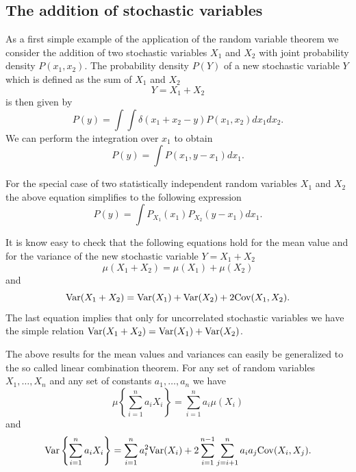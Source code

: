 \subsection{The addition of stochastic variables}
As a first simple example of the application of the random 
variable theorem we consider the addition of two stochastic 
variables $X_1$ and $X_2$ with joint probability density
$P(x_1,x_2)$. The probability density $P(Y) $ of a new stochastic variable
$Y$ which is defined as the sum of $X_1$ and $X_2$ 
\begin{equation}
Y = X_1 + X_2
\end{equation}
is then given by
\begin{equation}
P(y) = \int \int \delta(x_1 +x_2 -y) P(x_1,x_2) dx_1 dx_2.
\end{equation}
We can perform the integration over $x_1$ to obtain
\begin{equation}
P(y) = \int P(x_1,y-x_1) dx_1.
\end{equation}

For the special case of two statistically independent random 
variables $X_1$ and $X_2$ the above equation simplifies to the 
following expression
\begin{equation}
P(y) = \int P_{X_1}(x_1)P_{X_2}(y-x_1) dx_1.
\end{equation}

It is know easy to check that the following equations hold
for the mean value and for the variance of the new stochastic 
variable $Y=X_1 + X_2$
\begin{equation}
\mu(X_1 +X_2) = \mu(X_1) + \mu(X_2)
\end{equation}
and
\begin{equation*}
{\rm Var}(X_1 + X_2) = {\rm Var}(X_1) + {\rm Var}(X_2) +
            2 {\rm Cov}(X_1,X_2).
\end{equation*}
The last equation implies that only for uncorrelated stochastic 
variables we have the simple relation 
${\rm Var}(X_1 + X_2) = {\rm Var}(X_1) + {\rm Var}(X_2)$.

The above results for the mean values and variances can easily be 
generalized to the so called linear combination theorem. For any
set of random variables $X_1, \ldots, X_n$ and any set of 
constants $a_1,\ldots, a_n$ we have
\begin{equation*}
\mu\left\{  \sum_{i=1}^n a_i X_i \right\} =
     \sum_{i=1}^n a_i \mu(X_i) 
\end{equation*}
and
\begin{equation*}
{\rm Var}\left\{  \sum_{i=1}^n a_i X_i \right\} = 
    \sum_{i=1}^n a_i^2 {\rm Var}(X_i) + 
    2 \sum_{i=1}^{n-1} \sum_{j=i+1}^n a_i a_j {\rm Cov}(X_i,X_j).
\end{equation*}



